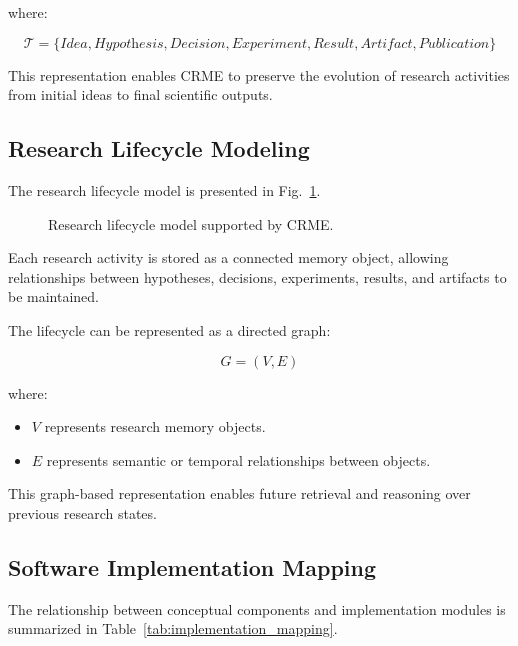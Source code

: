 where:

\[
\mathcal{T} =
\{
\textit{Idea},
\textit{Hypothesis},
\textit{Decision},
\textit{Experiment},
\textit{Result},
\textit{Artifact},
\textit{Publication}
\}
\]


This representation enables CRME to preserve the evolution of research
activities from initial ideas to final scientific outputs.



\subsection{Research Lifecycle Modeling}

The research lifecycle model is presented in
Fig.~\ref{fig:research_lifecycle}.


\begin{figure}[t]
\centering

\caption{Research lifecycle model supported by CRME.}
\label{fig:research_lifecycle}
\end{figure}


Each research activity is stored as a connected memory object, allowing
relationships between hypotheses, decisions, experiments, results, and
artifacts to be maintained.

The lifecycle can be represented as a directed graph:

\begin{equation}
G=(V,E)
\end{equation}

where:

\begin{itemize}

\item $V$ represents research memory objects.

\item $E$ represents semantic or temporal relationships between objects.

\end{itemize}


This graph-based representation enables future retrieval and reasoning
over previous research states.



\subsection{Software Implementation Mapping}

The relationship between conceptual components and implementation
modules is summarized in Table~\ref{tab:implementation_mapping}.


